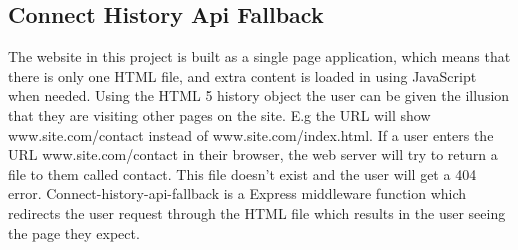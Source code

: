 \subsection{Connect History Api Fallback}
The website in this project is built as a single page application, which means that there is only one HTML file, and extra content is loaded in using JavaScript when needed. Using the HTML 5 history object the user can be given the illusion that they are visiting other pages on the site. E.g the URL will show www.site.com/contact instead of www.site.com/index.html. If a user enters the URL www.site.com/contact in their browser, the web server will try to return a file to them called contact. This file doesn't exist and the user will get a 404 error. Connect-history-api-fallback is a Express middleware function which redirects the user request through the HTML file which results in the user seeing the page they expect.